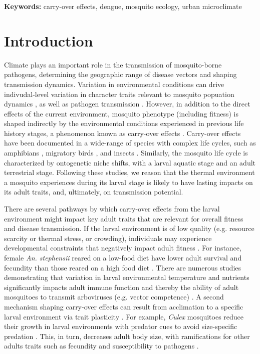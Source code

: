\documentclass[12pt]{article}
\begin{document}
\smallskip

\textbf{Keywords:} carry-over effects, dengue, mosquito ecology, urban microclimate

\linenumbers
\doublespacing
\setlength\parindent{20pt}%

\newpage

\section{Introduction}

Climate plays an important role in the transmission of mosquito-borne pathogens, determining the geographic range of disease vectors and shaping transmission dynamics. Variation in environmental conditions can drive indivudal-level variation in character traits relevant to mosquito popuation dynamics \citep{delatte2009, yang2009, alto2001}, as well as pathogen transmission \citep{murdock2012}. However, in addition to the direct effects of the current environment, mosquito phenotype (including fitness) is shaped indirectly by the environmental conditions experienced in previous life history stages, a phenomenon known as carry-over effects \citep{harrison2011}. Carry-over effects have been documented in a wide-range of species with complex life cycles, such as amphibians \citep{vonesh2005}, migratory birds \citep{norris2006}, and insects \citep{deblock2005a}. Similarly, the mosquito life cycle is characterized by ontogenetic niche shifts, with a larval aquatic stage and an adult terrestrial stage. Following these studies, we reason that the thermal environment a mosquito experiences during its larval stage is likely to have lasting impacts on its adult traits, and, ultimately, on transmission potential.

There are several pathways by which carry-over effects from the larval environment might impact key adult traits that are relevant for overall fitness and disease transmission. If the larval environment is of low quality (e.g. resource scarcity or thermal stress, or crowding), individuals may experience developmental constraints that negatively impact adult fitness \citep{inger2010}. For instance, female \textit{An. stephensii} reared on a low-food diet have lower adult survival and fecundity than those reared on a high food diet \citep{moller-jacobs2014, shapiro2016}. There are numerous studies demonstrating that variation in larval environmental temperature and nutrients significantly impacts adult immune function and thereby the ability of adult mosquitoes to transmit arboviruses (e.g. vector competence) \citep{muturi2012, price2015}. A second mechanism shaping carry-over effects can result from acclimation to a specific larval environment via trait plasticity \citep{monaghan2008}. For example, \textit{Culex} mosquitoes reduce their growth in larval environments with predator cues to avoid size-specific predation \citep{jourdan2016}. This, in turn, decreases adult body size, with ramifications for other adults traits such as fecundity \citep{lounibos2002} and susceptibility to pathogens \citep{paulson1991}.
\end{document}

